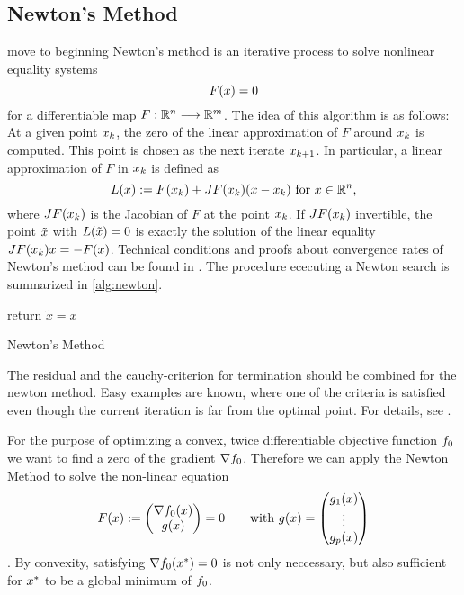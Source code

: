 \subsection{Newton's Method}
\todo move to beginning
Newton's method is an iterative process to solve nonlinear equality systems
\begin{equation}
F(x)= 0
\end{equation}
for a differentiable map $ F: \mathbb{R}^n \longrightarrow \mathbb{R}^m $. The idea of this algorithm is as follows: At a given point $ x_k $, the zero of the linear approximation of $ F $ around $ x_k $  is computed. This point is chosen as the next iterate $ x_{k+1} $. In particular, a linear approximation of $ F $ in  $ x_k $ is defined as
\begin{equation}
	L(x):= F(x_k) + J F (x_k)(x - x_k) \text{ for } x\in \mathbb{R}^n,
\end{equation}
where $ J F (x_k) $ is the Jacobian of $ F $ at the point $ x_k $. If $ J F (x_k) $ invertible, the point $ \tilde{x} $ with $ L(\tilde{x})=0 $ is exactly the solution of  the linear equality $ J F (x_k) x = -F(x) $.
Technical conditions and proofs about convergence rates of Newton's method can be found in \cite{SO}.
The procedure ececuting a Newton search is summarized in \eqref{alg:newton}.
\begin{algorithm}
	\SetAlgoLined
	\BlankLine
	return $ \tilde{x} = x $\;
	\caption{Newton's Method}
	\label{alg:newton}
\end{algorithm}

\begin{remark}
	The residual and the cauchy-criterion for termination should be combined for the newton method. Easy examples are known, where one of the criteria is satisfied even though the current iteration is far from the optimal point. For details, see \cite{SO}.
\end{remark}

For the purpose of optimizing a convex, twice differentiable objective function $ f_0 $ we want to find a zero of the gradient $ \nabla f_0 $. Therefore we can apply the Newton Method to solve the non-linear equation \[ F(x) := \begin{pmatrix} {\nabla f_0(x)} \\ {g(x)} \end{pmatrix} = 0 \qquad \text{with }  g(x) = \begin{pmatrix} {g_1(x)} \\ {\vdots} \\ {g_p(x)} \end{pmatrix} \]. By convexity, satisfying $ \nabla f_0 (x^*) = 0$ is not only neccessary, but also sufficient for $ x^* $ to be a global minimum of $ f_0 $.\\




